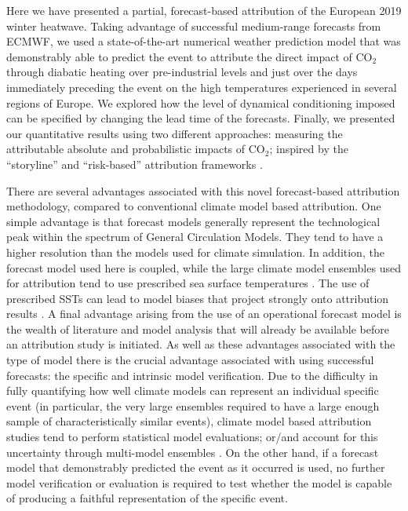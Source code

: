  Here we have presented a partial, forecast-based attribution of the European 2019 winter heatwave. Taking advantage of successful medium-range forecasts from ECMWF, we used a state-of-the-art numerical weather prediction model that was demonstrably able to predict the event to attribute the direct impact of CO$_2$ through diabatic heating over pre-industrial levels and just over the days immediately preceding the event on the high temperatures experienced in several regions of Europe. We explored how the level of dynamical conditioning imposed can be specified by changing the lead time of the forecasts. Finally, we presented our quantitative results using two different approaches: measuring the attributable absolute and probabilistic impacts of CO$_2$; inspired by the ``storyline'' and ``risk-based'' attribution frameworks \citep{stott_human_2004,shepherd_common_2016,winsberg_severe_2020,jezequel_behind_2018}.  
  
  There are several advantages associated with this novel forecast-based attribution methodology, compared to conventional climate model based attribution. One simple advantage is that forecast models generally represent the technological peak within the spectrum of General Circulation Models. They tend to have a higher resolution than the models used for climate simulation. In addition, the forecast model used here is coupled, while the large climate model ensembles used for attribution tend to use prescribed sea surface temperatures \citep{ciavarella_upgrade_2018}. The use of prescribed SSTs can lead to model biases that project strongly onto attribution results \citep{fischer_biased_2018}. A final advantage arising from the use of an operational forecast model is the wealth of literature and model analysis that will already be available before an attribution study is initiated. As well as these advantages associated with the type of model there is the crucial advantage associated with using successful forecasts: the specific and intrinsic model verification. Due to the difficulty in fully quantifying how well climate models can represent an individual specific event (in particular, the very large ensembles required to have a large enough sample of characteristically similar events), climate model based attribution studies tend to perform statistical model evaluations; or/and account for this uncertainty through multi-model ensembles \citep{philip_protocol_2020}. On the other hand, if a forecast model that demonstrably predicted the event as it occurred is used, no further model verification or evaluation is required to test whether the model is capable of producing a faithful representation of the specific event.
  
